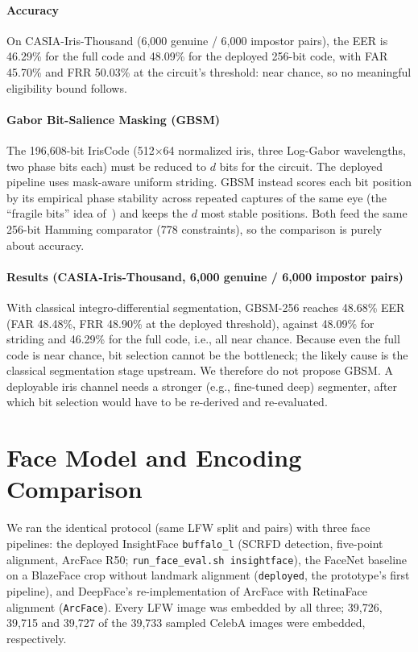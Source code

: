 \documentclass[10pt,letterpaper,journal]{IEEEtran}
\begin{document}
\paragraph{Accuracy} On CASIA-Iris-Thousand (6,000 genuine / 6,000 impostor pairs), the EER is 46.29\% for the full code and 48.09\% for the deployed 256-bit code, with FAR 45.70\% and FRR 50.03\% at the circuit's threshold: near chance, so no meaningful eligibility bound follows.

\paragraph{Gabor Bit-Salience Masking (GBSM)} The 196,608-bit IrisCode (512$\times$64 normalized iris, three Log-Gabor wavelengths, two phase bits each) must be reduced to $d$ bits for the circuit. The deployed pipeline uses mask-aware uniform striding. GBSM instead scores each bit position by its empirical phase stability across repeated captures of the same eye (the ``fragile bits'' idea of~\cite{Hollingsworth2009}) and keeps the $d$ most stable positions. Both feed the same 256-bit Hamming comparator (778 constraints), so the comparison is purely about accuracy.

\paragraph{Results (CASIA-Iris-Thousand, 6,000 genuine / 6,000 impostor pairs)} With classical integro-differential segmentation, GBSM-256 reaches 48.68\% EER (FAR 48.48\%, FRR 48.90\% at the deployed threshold), against 48.09\% for striding and 46.29\% for the full code, i.e., all near chance. Because even the full code is near chance, bit selection cannot be the bottleneck; the likely cause is the classical segmentation stage upstream. We therefore do not propose GBSM. A deployable iris channel needs a stronger (e.g., fine-tuned deep) segmenter, after which bit selection would have to be re-derived and re-evaluated.


\section{Face Model and Encoding Comparison}
\label{sec:supp-face-models}

We ran the identical protocol (same LFW split and pairs) with three face pipelines: the deployed InsightFace \texttt{buffalo\_l} (SCRFD detection, five-point alignment, ArcFace R50; \texttt{run\_face\_eval.sh insightface}), the FaceNet baseline on a BlazeFace crop without landmark alignment (\texttt{deployed}, the prototype's first pipeline), and DeepFace's re-implementation of ArcFace with RetinaFace alignment (\texttt{ArcFace}). Every LFW image was embedded by all three; 39,726, 39,715 and 39,727 of the 39,733 sampled CelebA images were embedded, respectively.
\end{document}
